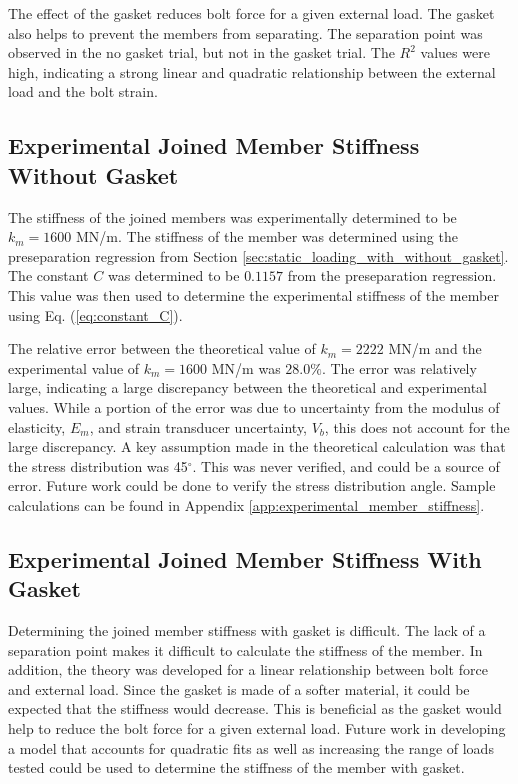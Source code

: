 The effect of the gasket reduces bolt force for a given external load. The gasket also helps to prevent the members from separating. The separation point was observed in the no gasket trial, but not in the gasket trial. The $R^2$ values were high, indicating a strong linear and quadratic relationship between the external load and the bolt strain. 

\subsection{Experimental Joined Member Stiffness Without Gasket}
The stiffness of the joined members was experimentally determined to be $k_m = 1600$ MN/m. The stiffness of the member was determined using the preseparation  regression from Section \ref{sec:static_loading_with_without_gasket}. The constant $C$ was determined to be $0.1157$ from the preseparation regression. This value was then used to determine the experimental stiffness of the member using Eq. (\ref{eq:constant_C}). 

The relative error between the theoretical value of $k_m = 2222$ MN/m and the experimental value of $k_m = 1600$ MN/m was $28.0\%$. The error was relatively large, indicating a large discrepancy between the theoretical and experimental values. While a portion of the error was due to uncertainty from the modulus of elasticity, $E_m$, and strain transducer uncertainty, $V_b$, this does not account for the large discrepancy. A key assumption made in the theoretical calculation was that the stress distribution was 45$^\circ$. This was never verified, and could be a source of error. Future work could be done to verify the stress distribution angle. Sample calculations can be found in Appendix \ref{app:experimental_member_stiffness}.

\subsection{Experimental Joined Member Stiffness With Gasket}
Determining the joined member stiffness with gasket is difficult. The lack of a separation point makes it difficult to calculate the stiffness of the member. In addition, the theory was developed for a linear relationship between bolt force and external load. Since the gasket is made of a softer material, it could be expected that the stiffness would decrease. This is beneficial as the gasket would help to reduce the bolt force for a given external load. Future work in developing a model that accounts for quadratic fits as well as increasing the range of loads tested could be used to determine the stiffness of the member with gasket.

